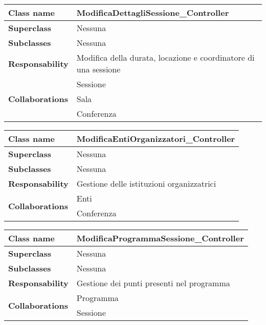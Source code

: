 \begin{table}[h!]
	\begin{tabular}{|l|l|}
		\hline 
		\textbf{Class name} & ModificaDettagliSessione\_Controller
		\\ \hline
		\textbf{Superclass} & Nessuna
		\\ \hline
		\multirow{1}{*}{\textbf{Subclasses}} & Nessuna
		\\ \hline
		\textbf{Responsability} & Modifica della durata, locazione e coordinatore di una sessione
		\\ \hline
		\multirow{3}{*}{\textbf{Collaborations}} & Sessione \\
		& Sala \\
		& Conferenza
		\\ \hline
	\end{tabular}
\end{table}
\begin{table}[h!]
	\begin{tabular}{|l|l|}
		\hline 
		\textbf{Class name} & ModificaEntiOrganizzatori\_Controller
		\\ \hline
		\textbf{Superclass} & Nessuna
		\\ \hline
		\multirow{1}{*}{\textbf{Subclasses}} & Nessuna
		\\ \hline
		\textbf{Responsability} & Gestione delle istituzioni organizzatrici
		\\ \hline
		\multirow{2}{*}{\textbf{Collaborations}} & Enti \\
		& Conferenza		\\ \hline
	\end{tabular}
\end{table}
\begin{table}[h!]
	\begin{tabular}{|l|l|}
		\hline 
		\textbf{Class name} & ModificaProgrammaSessione\_Controller
		\\ \hline
		\textbf{Superclass} & Nessuna
		\\ \hline
		\multirow{1}{*}{\textbf{Subclasses}} & Nessuna
		\\ \hline
		\textbf{Responsability} & Gestione dei punti presenti nel programma
		\\ \hline
		\multirow{2}{*}{\textbf{Collaborations}} & Programma \\
		& Sessione 		\\ \hline
	\end{tabular}
\end{table}
